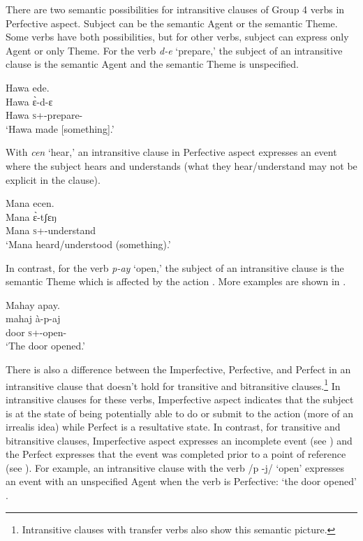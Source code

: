 There are two semantic possibilities for intransitive clauses of Group 4 verbs in Perfective aspect. Subject can be the semantic Agent or the semantic Theme. Some verbs have both possibilities, but for other verbs, subject can express only Agent or only Theme. For the verb \textit{d-e} ‘prepare,’ the subject of an intransitive clause is the semantic Agent  and the semantic Theme is unspecified. 

\ea \label{ex:9:25}
Hawa  ede. \\
\gll  Hawa   \`ɛ{}-d-ɛ \\
      Hawa  \textsc{s}+{\PFV}-prepare-{\CL}\\
\glt  ‘Hawa made [something].’ 
\z

With \textit{cen} ‘hear,’ an intransitive clause in Perfective aspect  expresses an event where the subject hears and understands (what they hear/understand may not be explicit in the clause). 

\ea \label{ex:9:26}
Mana  ecen. \\
\gll  Mana   \`ɛ{}-tʃɛŋ \\
      Mana  \textsc{s}+{\PFV}-understand\\
\glt  ‘Mana heard/understood (something).’
\z

In contrast, for the verb \textit{p-ay} ‘open,’ the subject of an intransitive clause is the semantic Theme which is affected by the action . More examples are shown in .

 
\ea \label{ex:9:27}
Mahay  apay.\\
\gll  mahaj   à-p-aj\\
      door  \textsc{s}+{\PFV}-open{}-{\CL}\\
\glt  ‘The door opened.’ 
\z

There is also a difference between the Imperfective, Perfective, and Perfect in an intransitive clause that doesn’t hold for transitive and bitransitive clauses.\footnote{Intransitive clauses with transfer verbs  also show this semantic picture.} In intransitive clauses for these verbs, Imperfective aspect indicates that the subject is at the state of being potentially able to do or submit to the action (more of an irrealis idea) while Perfect is a resultative state. In contrast, for transitive and bitransitive clauses, Imperfective aspect expresses an incomplete event  (see ) and the Perfect expresses that the event was completed prior to a point of reference (see ).  For example, an intransitive clause with the verb /p -j/ ‘open’ expresses an event with an unspecified Agent when the verb is Perfective: ‘the door opened’ . 

